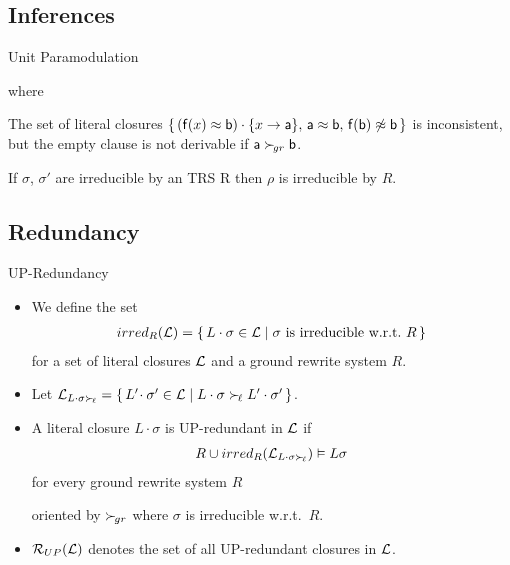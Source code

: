 \documentclass[%
handout,
]{beamer}
\begin{document}
\subsection{Inferences}
\begin{frame}{Unit Paramodulation}

    
    
    where
    

    \vspace{0.7em}

        \begin{example}
    The set of literal closures
    $\{\,
    (\mathsf{f}(x)\approx\mathsf{b})\cdot\{x\to\mathsf{a}\},\,
    \mathsf{a}\approx \mathsf{b},\,
    \mathsf{f}(\mathsf{b})\not\approx\mathsf{b}\,
    \}$ is inconsistent,
    but the empty clause is not derivable
    if $\mathsf{a}\mathrel\succ_{\!gr}\mathsf{b}$.
        \end{example}

        \vspace{0.7em}

    \begin{lemma}
        If $\sigma$, $\sigma'$ are irreducible by an TRS R then $\rho$ is irreducible by $R$.
    \end{lemma}

\end{frame}


\subsection{Redundancy}
\begin{frame}{UP-Redundancy}
    \begin{itemize}
        \item
    We define the set
    \begin{gather*}
        irred_R(\mathcal{L}) =
        \{\,
        L\cdot\sigma\in\mathcal{L} \mid
        \sigma\text{ is irreducible w.r.t.~}R
        \,\}
    \end{gather*}
    for a set of literal closures $\mathcal{L}$
    and a ground rewrite system $R$.
    
    \vspace{0.7em}
    \item Let 
    $
    \mathcal{L}_{L\cdot\sigma\mathrel\succ_{\!\ell}} =
    \{\,
    L'\!\cdot\sigma'\in\mathcal{L} \mid
    L\cdot\sigma\mathrel\succ_{\!\ell} L'\cdot\sigma'
    \,\}
    $.

    \vspace{0.7em}
    \item A literal closure $L\cdot\sigma$ is UP-redundant in $\mathcal{L}$ if
    \begin{gather*}
        R \cup irred_R(\mathcal{L}_{L\cdot\sigma\mathrel\succ_{\!\ell}}) \vDash L\sigma
    \end{gather*}
    for every ground rewrite system $R$

    oriented by $\mathrel\succ_{\!gr}$
    where $\sigma$ is irreducible w.r.t.~$R$.

    \vspace{0.7em}
    \item
    $\mathcal{R}_{UP}(\mathcal{L})$ denotes the set of all UP-redundant closures in $\mathcal{L}$.
\end{itemize}
\end{frame}
\end{document}
